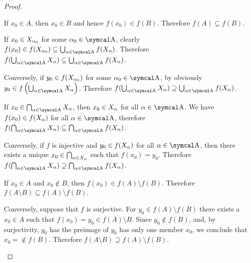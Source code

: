 \begin{proof}\mbox{}
  \begin{propenum}
     If \( x_0 \in A \), then \( x_0 \in B \) and hence \( f(x_0) \in f(B) \). Therefore \( f(A) \subseteq f(B) \).

     If \( x_0 \in X_{\alpha_0} \) for some \( \al_0 \in \CA \), clearly \( f(x_0) \in f(X_{\al_0}) \subseteq \bigcup_{\al \in \CA} f(X_\al) \). Therefore \( f(\bigcup_{\al \in \CA} X_\al) \subseteq \bigcup_{\al \in \CA} f(X_\al) \).

    Conversely, if \( y_0 \in f(X_{\alpha_0}) \) for some \( \al_0 \in \CA \), by  obviously \( y_0 \in f\left( \bigcup_{\al \in \CA} X_\al \right) \). Therefore \( f(\bigcup_{\al \in \CA} X_\al) \supseteq \bigcup_{\al \in \CA} f(X_\al) \).

     If \( x_0 \in \bigcap_{\al \in \CA} X_{\al} \), then \( x_0 \in X_\alpha \) for all \( \al \in \CA \). We have \( f(x_0) \in f(X_\alpha) \) for all \( \al \in \CA \), therefore \( f(\bigcap_{\al \in \CA} X_\al) \subseteq \bigcap_{\al \in \CA} f(X_\al) \).

    Conversely, if \( f \) is injective and \( y_0 \in f(X_\alpha) \) for all \( \al \in \CA \), then there exists a unique \( x_0 \in \bigcap_{\alpha \in X_\alpha} \) such that \( f(x_0) = y_0 \). Therefore \( f(\bigcap_{\al \in \CA} X_\al) \supseteq \bigcap_{\al \in \CA} f(X_\al) \).

     If \( x_0 \in A \) and \( x_0 \not\in B \), then \( f(x_0) \in f(A) \setminus f(B) \). Therefore \( f(A \setminus B) \subseteq f(A) \setminus f(B) \).

    Conversely, suppose that \( f \) is surjective. For \( y_0 \in f(A) \setminus f(B) \) there exists a \( x_0 \in A \) such that \( f(x_0) = y_0 \in f(A) \setminus B \). Since \( y_0 \not\in f(B) \), and, by surjectivity, \( y_0 \) has the preimage of \( y_0 \) has only one member \( x_0 \), we conclude that \( x_0 = \not\in f(B) \). Therefore \( f(A \setminus B) \supseteq f(A) \setminus f(B) \).
  \end{propenum}
\end{proof}

